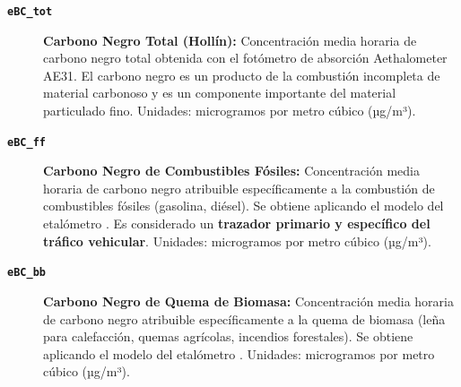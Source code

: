 \begin{description}
    \item[\textbf{\texttt{eBC\_tot}}] \textbf{Carbono Negro Total (Hollín):} Concentración media horaria de carbono negro total obtenida con el fotómetro de absorción Aethalometer AE31. El carbono negro es un producto de la combustión incompleta de material carbonoso y es un componente importante del material particulado fino. Unidades: microgramos por metro cúbico (µg/m³).

    \item[\textbf{\texttt{eBC\_ff}}] \textbf{Carbono Negro de Combustibles Fósiles:} Concentración media horaria de carbono negro atribuible específicamente a la combustión de combustibles fósiles (gasolina, diésel). Se obtiene aplicando el modelo del etalómetro \citep{sandradewi_source_2008}. Es considerado un \textbf{trazador primario y específico del tráfico vehicular}. Unidades: microgramos por metro cúbico (µg/m³).

    \item[\textbf{\texttt{eBC\_bb}}] \textbf{Carbono Negro de Quema de Biomasa:} Concentración media horaria de carbono negro atribuible específicamente a la quema de biomasa (leña para calefacción, quemas agrícolas, incendios forestales). Se obtiene aplicando el modelo del etalómetro  \citep{sandradewi_source_2008}. Unidades: microgramos por metro cúbico (µg/m³).
\end{description}

